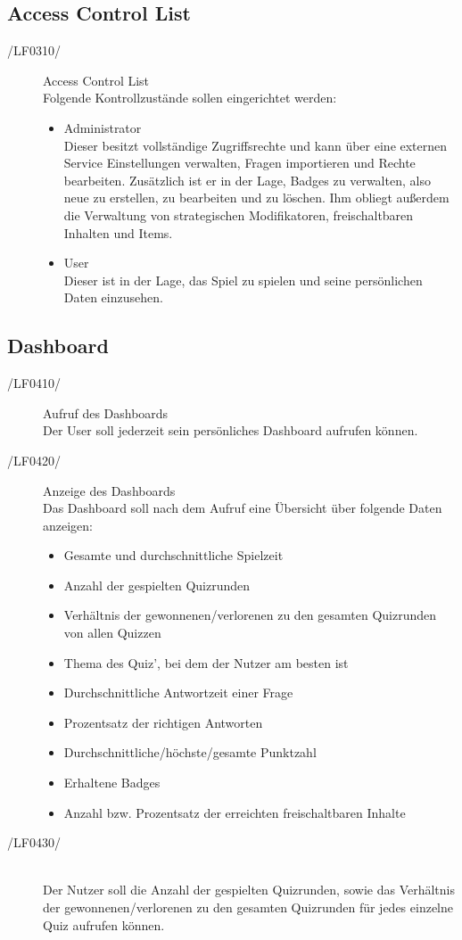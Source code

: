 \documentclass[11pt,a4paper]{scrreprt}
\begin{document}
\subsection{Access Control List}
\begin{description}
\item[/LF0310/] Access Control List \\
Folgende Kontrollzustände sollen eingerichtet werden:
	\begin{itemize}
	\item Administrator \\
	Dieser besitzt vollständige Zugriffsrechte und kann über eine externen Service Einstellungen verwalten, Fragen 				importieren und Rechte bearbeiten. Zusätzlich ist er in der Lage, Badges zu verwalten, also neue zu erstellen, zu 				bearbeiten und zu löschen. Ihm obliegt außerdem die Verwaltung von strategischen Modifikatoren, freischaltbaren 			Inhalten und Items.
	\item User \\
	Dieser ist in der Lage, das Spiel zu spielen und seine persönlichen Daten einzusehen.
	\end{itemize}

\end{description}

\subsection{Dashboard}
\begin{description}
\item[/LF0410/] Aufruf des Dashboards \\
Der User soll jederzeit sein persönliches Dashboard aufrufen können.

\item[/LF0420/] Anzeige des Dashboards  \\
Das Dashboard soll nach dem Aufruf eine Übersicht über folgende Daten anzeigen:
\begin{itemize}
	\item Gesamte und durchschnittliche Spielzeit
	\item Anzahl der gespielten Quizrunden
	\item Verhältnis der gewonnenen/verlorenen zu den gesamten Quizrunden von allen Quizzen
	\item Thema des Quiz', bei dem der Nutzer am besten ist
	\item Durchschnittliche Antwortzeit einer Frage
	\item Prozentsatz der richtigen Antworten
	\item Durchschnittliche/höchste/gesamte Punktzahl
	\item Erhaltene Badges
	\item Anzahl bzw. Prozentsatz der erreichten freischaltbaren Inhalte
\end{itemize}

\item[/LF0430/]\ \\
Der Nutzer soll die Anzahl der gespielten Quizrunden, sowie das Verhältnis der gewonnenen/verlorenen zu den gesamten Quizrunden für jedes einzelne Quiz aufrufen können.
\end{description}
\end{document}
